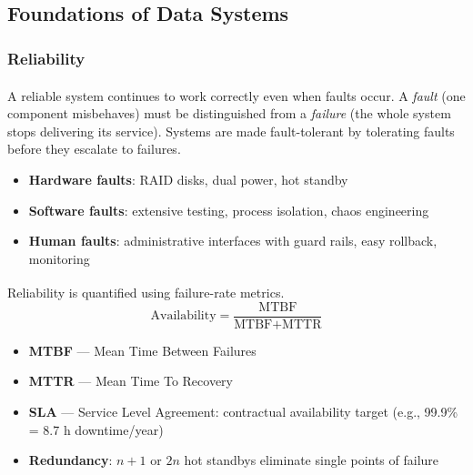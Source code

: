 \subsection{Foundations of Data Systems}

\subsubsection{Reliability}

\begin{tcbitemize}[ skin=sectionraster ]
    \tcbitem[title=Reliability in Data Systems, raster multicolumn=3]
    A reliable system continues to work correctly even when faults occur\textsuperscript{\cite{gujaStartingDataAnalytics2025}}.
    A \emph{fault} (one component misbehaves) must be distinguished from a \emph{failure} (the whole system stops delivering its service).
    Systems are made fault-tolerant by tolerating faults before they escalate to failures.
    \tcblower
    \begin{itemize}
        \item \textbf{Hardware faults}: RAID disks, dual power, hot standby
        \item \textbf{Software faults}: extensive testing, process isolation, chaos engineering
        \item \textbf{Human faults}: administrative interfaces with guard rails, easy rollback, monitoring
    \end{itemize}

    \tcbitem[title={MTBF, MTTR, Availability}, raster multicolumn=3]
    Reliability is quantified using failure-rate metrics\textsuperscript{\cite{gujaStartingDataAnalytics2025}}.
    \begin{equation}
        \text{Availability} = \frac{\text{MTBF}}{\text{MTBF} + \text{MTTR}}
    \end{equation}
    \begin{itemize}
        \item \textbf{MTBF} — Mean Time Between Failures
        \item \textbf{MTTR} — Mean Time To Recovery
        \item \textbf{SLA} — Service Level Agreement: contractual availability target (e.g., 99.9\% = 8.7 h downtime/year)
        \item \textbf{Redundancy}: $n+1$ or $2n$ hot standbys eliminate single points of failure
    \end{itemize}
\end{tcbitemize}

